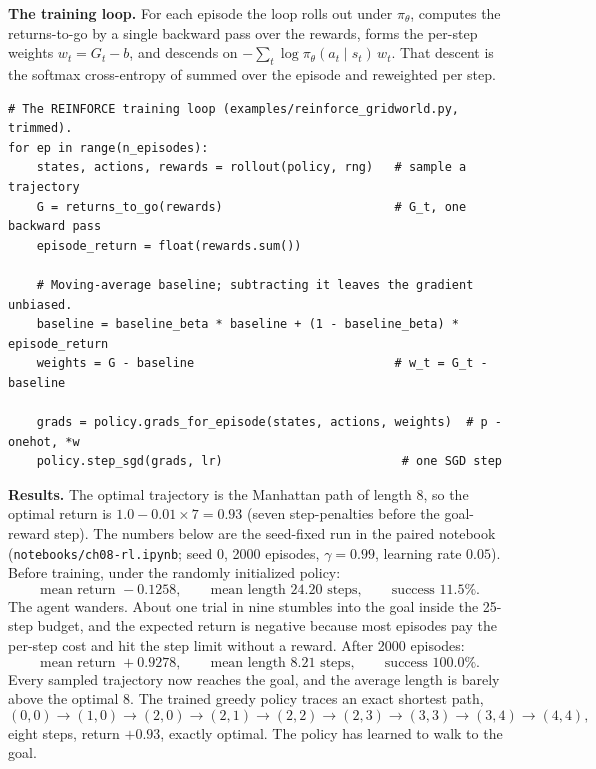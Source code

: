 \textbf{The training loop.} For each episode the loop rolls out under
$\pi_\theta$, computes the returns-to-go by a single backward pass over the
rewards, forms the per-step weights $w_t = G_t - b$, and descends on
$-\sum_t \log \pi_\theta(a_t \mid s_t)\, w_t$. That descent is the softmax
cross-entropy of  summed over the episode and
reweighted per step.

\begin{lstlisting}
# The REINFORCE training loop (examples/reinforce_gridworld.py, trimmed).
for ep in range(n_episodes):
    states, actions, rewards = rollout(policy, rng)   # sample a trajectory
    G = returns_to_go(rewards)                        # G_t, one backward pass
    episode_return = float(rewards.sum())

    # Moving-average baseline; subtracting it leaves the gradient unbiased.
    baseline = baseline_beta * baseline + (1 - baseline_beta) * episode_return
    weights = G - baseline                            # w_t = G_t - baseline

    grads = policy.grads_for_episode(states, actions, weights)  # p - onehot, *w
    policy.step_sgd(grads, lr)                         # one SGD step
\end{lstlisting}

\textbf{Results.} The optimal trajectory is the Manhattan path of length 8, so
the optimal return is $1.0 - 0.01 \times 7 = 0.93$ (seven step-penalties
before the goal-reward step). The numbers below are the seed-fixed run in the
paired notebook (\texttt{notebooks/ch08-rl.ipynb}; seed 0, 2000 episodes,
$\gamma = 0.99$, learning rate $0.05$). Before training, under the randomly initialized
policy:
\[
  \text{mean return } -0.1258,
  \qquad \text{mean length } 24.20 \text{ steps},
  \qquad \text{success } 11.5\%.
\]
The agent wanders. About one trial in nine stumbles into the goal inside the
25-step budget, and the expected return is negative because most episodes pay
the per-step cost and hit the step limit without a reward. After 2000
episodes:
\[
  \text{mean return } +0.9278,
  \qquad \text{mean length } 8.21 \text{ steps},
  \qquad \text{success } 100.0\%.
\]
Every sampled trajectory now reaches the goal, and the average length is barely
above the optimal 8. The trained greedy policy traces an exact shortest path,
\[
  (0,0) \to (1,0) \to (2,0) \to (2,1) \to (2,2) \to (2,3) \to (3,3) \to (3,4)
  \to (4,4),
\]
eight steps, return $+0.93$, exactly optimal. The policy has learned to walk
to the goal.

